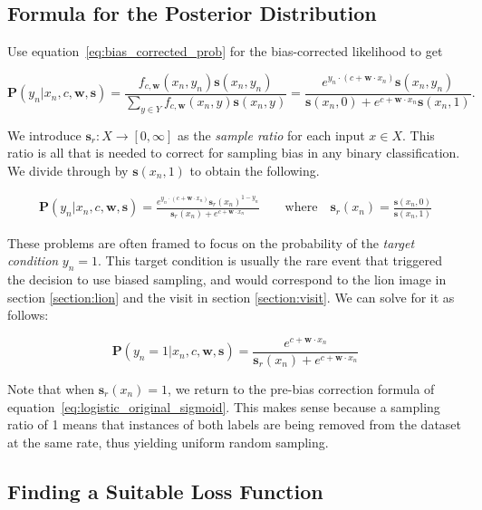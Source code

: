 \documentclass[twoside]{article}
\begin{document}
\subsection{Formula for the Posterior Distribution}

Use equation~\eqref{eq:bias_corrected_prob} for the bias-corrected likelihood to get

\[\mathbf{P}(y_n|x_n,c,\mathbf{w},\mathbf{s})=\frac{f_{c,\mathbf{w}}(x_n,y_n)\mathbf{s}(x_n,y_n)}{\sum_{y \in Y}f_{c,\mathbf{w}}(x_n,y)\mathbf{s}(x_n,y)}=\frac{e^{y_n \cdot (c+\mathbf{w} \cdot x_n)}\mathbf{s}(x_n,y_n)}{\mathbf{s}(x_n,0)+e^{c+\mathbf{w} \cdot x_n}\mathbf{s}(x_n,1)}.\]

We introduce \(\mathbf{s}_r: X \to [0, \infty]\) as the \textit{sample ratio} for each input \(x \in X\). This ratio is all that is needed to correct for sampling bias in any binary classification. We divide through by \(\mathbf{s}(x_n,1)\) to obtain the following.

\begin{align}
\mathbf{P}(y_n|x_n,c,\mathbf{w},\mathbf{s})=\frac{e^{y_n \cdot (c+\mathbf{w} \cdot x_n)}\mathbf{s}_r(x_n)^{1 - y_n}}{\mathbf{s}_r(x_n)+e^{c+\mathbf{w} \cdot x_n}}
\qquad \textrm{where} \quad \mathbf{s}_r(x_n)=\frac{\mathbf{s}(x_n, 0)}{\mathbf{s}(x_n, 1)}
\end{align}

These problems are often framed to focus on the probability of the \textit{target condition} \(y_n = 1\). This target condition is usually the rare event that triggered the decision to use biased sampling, and would correspond to the lion image in section \ref{section:lion} and the visit in section \ref{section:visit}. We can solve for it as follows:

\begin{equation}
\label{eq:logistic_corrected_targed_prob}
\mathbf{P}(y_n = 1|x_n,c,\mathbf{w},\mathbf{s})=\frac{e^{c+\mathbf{w} \cdot x_n}}{\mathbf{s}_r(x_n)+e^{c+\mathbf{w} \cdot x_n}}
\end{equation}

Note that when \(\mathbf{s}_r(x_n) = 1\), we return to the pre-bias correction formula of equation~\eqref{eq:logistic_original_sigmoid}. This makes sense because a sampling ratio of 1 means that instances of both labels are being removed from the dataset at the same rate, thus yielding uniform random sampling.

\subsection{Finding a Suitable Loss Function}
\end{document}
